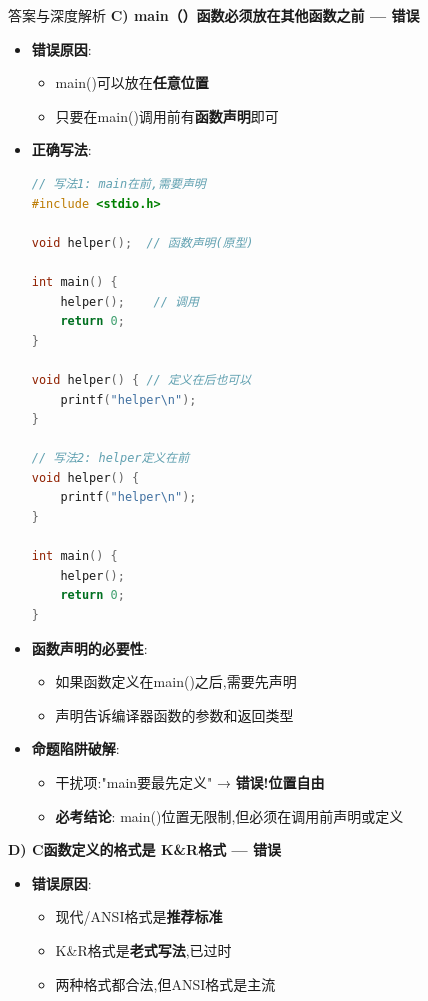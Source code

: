 \documentclass[a4paper,12pt]{article}
\begin{document}
\begin{bluebox}{答案与深度解析}
	\textbf{C) main（）函数必须放在其他函数之前 — 错误}
	\begin{itemize}[leftmargin=*, nosep]
		\item \textbf{错误原因}:
		      \begin{itemize}
			      \item main()可以放在\textbf{任意位置}
			      \item 只要在main()调用前有\textbf{函数声明}即可
		      \end{itemize}

		\item \textbf{正确写法}:
		      \begin{lstlisting}[language=C]
// 写法1: main在前,需要声明
#include <stdio.h>

void helper();  // 函数声明(原型)

int main() {
    helper();    // 调用
    return 0;
}

void helper() { // 定义在后也可以
    printf("helper\n");
}

// 写法2: helper定义在前
void helper() {
    printf("helper\n");
}

int main() {
    helper();
    return 0;
}
    \end{lstlisting}

		\item \textbf{函数声明的必要性}:
		      \begin{itemize}
			      \item 如果函数定义在main()之后,需要先声明
			      \item 声明告诉编译器函数的参数和返回类型
		      \end{itemize}

		\item \textbf{命题陷阱破解}:
		      \begin{itemize}
			      \item 干扰项:"main要最先定义" → \textbf{错误!位置自由}
			      \item \textbf{必考结论}: main()位置无限制,但必须在调用前声明或定义
		      \end{itemize}
	\end{itemize}

	\textbf{D) C函数定义的格式是 K\&R格式 — 错误}
	\begin{itemize}[leftmargin=*, nosep]
		\item \textbf{错误原因}:
		      \begin{itemize}
			      \item 现代/ANSI格式是\textbf{推荐标准}
			      \item K\&R格式是\textbf{老式写法},已过时
			      \item 两种格式都合法,但ANSI格式是主流
		      \end{itemize}


\end{itemize}
\end{bluebox}
\end{document}
